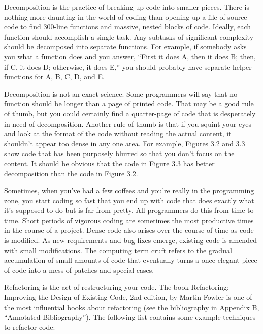 
Decomposition is the practice of breaking up code into smaller pieces. There is nothing more daunting in the world of coding than opening up a file of source code to find 300-line functions and massive, nested blocks of code. Ideally, each function should accomplish a single task. Any subtasks of significant complexity should be decomposed into separate functions. For example, if somebody asks you what a function does and you answer, “First it does A, then it does B; then, if C, it does D; otherwise, it does E,” you should probably have separate helper functions for A, B, C, D, and E.

Decomposition is not an exact science. Some programmers will say that no function should be longer than a page of printed code. That may be a good rule of thumb, but you could certainly find a quarter-page of code that is desperately in need of decomposition. Another rule of thumb is that if you squint your eyes and look at the format of the code without reading the actual content, it shouldn’t appear too dense in any one area. For example, Figures 3.2 and 3.3 show code that has been purposely blurred so that you don’t focus on the content. It should be obvious that the code in Figure 3.3 has better decomposition than the code in Figure 3.2.




Sometimes, when you’ve had a few coffees and you’re really in the programming zone, you start coding so fast that you end up with code that does exactly what it’s supposed to do but is far from pretty. All programmers do this from time to time. Short periods of vigorous coding are sometimes the most productive times in the course of a project. Dense code also arises over the course of time as code is modified. As new requirements and bug fixes emerge, existing code is amended with small modifications. The computing term cruft refers to the gradual accumulation of small amounts of code that eventually turns a once-elegant piece of code into a mess of patches and special cases.

Refactoring is the act of restructuring your code. The book Refactoring: Improving the Design of Existing Code, 2nd edition, by Martin Fowler is one of the most influential books about refactoring (see the bibliography in Appendix B, “Annotated Bibliography”). The following list contains some example techniques to refactor code:

